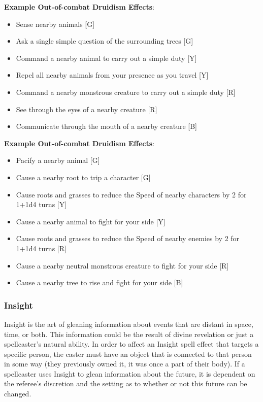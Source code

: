 \documentclass[oneside]{book}
\begin{document}
\begin{multicols}{2}
\textbf{Example Out-of-combat Druidism Effects}: 
	\begin{itemize}
		\setlength{\itemsep}{0cm}%
  		\setlength{\parskip}{0cm}%
		\item{ \small Sense nearby animals [G]}
		\item{ \small Ask a single simple question of the surrounding trees [G]}
		\item{ \small Command a nearby animal to carry out a simple duty [Y]}
		\item{ \small Repel all nearby animals from your presence as you travel [Y]}
		\item{ \small Command a nearby monstrous creature to carry out a simple duty [R]}
		\item{ \small See through the eyes of a nearby creature [R]}
		\item{ \small Communicate through the mouth of a nearby creature [B]}
	\end{itemize}
	
\textbf{Example Out-of-combat Druidism Effects}: 
	\begin{itemize}
		\setlength{\itemsep}{0cm}%
  		\setlength{\parskip}{0cm}%
		\item{ \small Pacify a nearby animal [G]}
		\item{ \small Cause a nearby root to trip a character [G]}
		\item{ \small Cause roots and grasses to reduce the Speed of nearby characters by 2 for 1+1d4 turns [Y]}
		\item{ \small Cause a nearby animal to fight for your side [Y]}
		\item{ \small Cause roots and grasses to reduce the Speed of nearby enemies by 2 for 1+1d4 turns [R]}
		\item{ \small Cause a nearby neutral monstrous creature to fight for your side [R]}
		\item{ \small Cause a nearby tree to rise and fight for your side [B]}
	\end{itemize}

\subsubsection{Insight}
Insight is the art of gleaning information about events that are distant in space, time, or both. This information could be the result of divine revelation or just a spellcaster's natural ability. In order to affect an Insight spell effect that targets a specific person, the caster must have an object that is connected to that person in some way (they previously owned it, it was once a part of their body). If a spellcaster uses Insight to glean information about the future, it is dependent on the referee's discretion and the setting as to whether or not this future can be changed.


\end{multicols}
\end{document}
